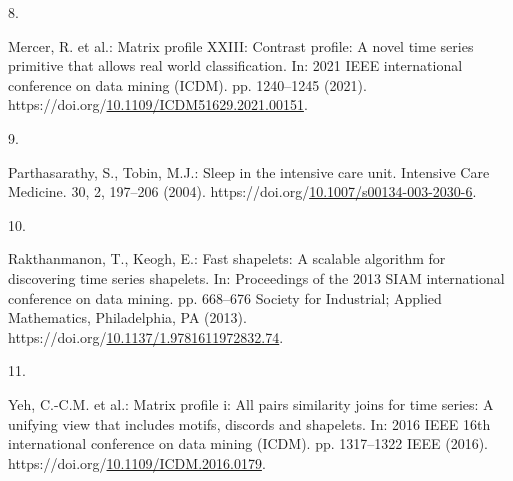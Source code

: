 \documentclass[runningheads]{llncs}
\newlength{\cslhangindent}
\newlength{\csllabelwidth}
\newenvironment{CSLReferences}[2] %
 {%
  \setlength{\parindent}{0pt}
  \ifodd #1 \everypar{\setlength{\hangindent}{\cslhangindent}}\ignorespaces\fi
  \ifnum #2 > 0
  \setlength{\parskip}{#2\baselineskip}
  \fi
 }%
 {}
\newcommand{\CSLLeftMargin}[1]{\parbox[t]{\csllabelwidth}{#1}}
\newcommand{\CSLRightInline}[1]{\parbox[t]{\linewidth - \csllabelwidth}{#1}\break}
\begin{document}
\begin{CSLReferences}{0}{0}
\leavevmode{}%
\CSLLeftMargin{8. }
\CSLRightInline{Mercer, R. et al.: Matrix profile XXIII: Contrast profile: A novel time series primitive that allows real world classification. In: 2021 IEEE international conference on data mining (ICDM). pp. 1240--1245 (2021). https://doi.org/\href{https://doi.org/10.1109/ICDM51629.2021.00151}{10.1109/ICDM51629.2021.00151}.}

\leavevmode{}%
\CSLLeftMargin{9. }
\CSLRightInline{Parthasarathy, S., Tobin, M.J.: Sleep in the intensive care unit. Intensive Care Medicine. 30, 2, 197--206 (2004). https://doi.org/\href{https://doi.org/10.1007/s00134-003-2030-6}{10.1007/s00134-003-2030-6}.}

\leavevmode{}%
\CSLLeftMargin{10. }
\CSLRightInline{Rakthanmanon, T., Keogh, E.: Fast shapelets: A scalable algorithm for discovering time series shapelets. In: Proceedings of the 2013 SIAM international conference on data mining. pp. 668--676 Society for Industrial; Applied Mathematics, Philadelphia, PA (2013). https://doi.org/\href{https://doi.org/10.1137/1.9781611972832.74}{10.1137/1.9781611972832.74}.}

\leavevmode{}%
\CSLLeftMargin{11. }
\CSLRightInline{Yeh, C.-C.M. et al.: Matrix profile i: All pairs similarity joins for time series: A unifying view that includes motifs, discords and shapelets. In: 2016 IEEE 16th international conference on data mining (ICDM). pp. 1317--1322 IEEE (2016). https://doi.org/\href{https://doi.org/10.1109/ICDM.2016.0179}{10.1109/ICDM.2016.0179}.}

\end{CSLReferences}
\end{document}
